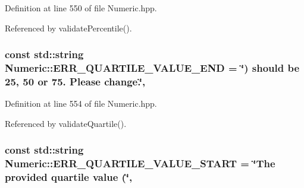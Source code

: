 Definition at line 550 of file Numeric.\-hpp.



Referenced by validate\-Percentile().

\hypertarget{classmultiscale_1_1Numeric_ac63a2d1c105ab47208d6c40827f9769c}{
\subsubsection[{E\-R\-R\-\_\-\-Q\-U\-A\-R\-T\-I\-L\-E\-\_\-\-V\-A\-L\-U\-E\-\_\-\-E\-N\-D}]{\setlength{\rightskip}{0pt plus 5cm}const std\-::string Numeric\-::\-E\-R\-R\-\_\-\-Q\-U\-A\-R\-T\-I\-L\-E\-\_\-\-V\-A\-L\-U\-E\-\_\-\-E\-N\-D = \char`\"{}) should be 25, 50 or 75. Please change.\char`\"{}\hspace{0.3cm}{\ttfamily [static]}, {\ttfamily [private]}}}\label{classmultiscale_1_1Numeric_ac63a2d1c105ab47208d6c40827f9769c}


Definition at line 554 of file Numeric.\-hpp.



Referenced by validate\-Quartile().

\hypertarget{classmultiscale_1_1Numeric_ac76a6a6f1fa8abae2855f4fed0f0d97e}{
\subsubsection[{E\-R\-R\-\_\-\-Q\-U\-A\-R\-T\-I\-L\-E\-\_\-\-V\-A\-L\-U\-E\-\_\-\-S\-T\-A\-R\-T}]{\setlength{\rightskip}{0pt plus 5cm}const std\-::string Numeric\-::\-E\-R\-R\-\_\-\-Q\-U\-A\-R\-T\-I\-L\-E\-\_\-\-V\-A\-L\-U\-E\-\_\-\-S\-T\-A\-R\-T = \char`\"{}The provided {\bf quartile} value (\char`\"{}\hspace{0.3cm}{\ttfamily [static]}, {\ttfamily [private]}}}\label{classmultiscale_1_1Numeric_ac76a6a6f1fa8abae2855f4fed0f0d97e}


